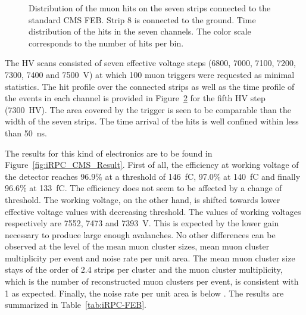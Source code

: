 \begin{figure}[H]
\begin{subfigure}{0.45\linewidth}
			\caption{\label{fig:iRPC_CMS_Profiles:B}}
		\end{subfigure}
		\caption{\label{fig:iRPC_CMS_Profiles}  Distribution of the muon hits on the seven strips connected to the standard CMS FEB. Strip 8 is connected to the ground.  Time distribution of the hits in the seven channels. The color scale corresponds to the number of hits per bin.}
    \end{figure}
    
    The HV scans consisted of seven effective voltage steps (6800, 7000, 7100, 7200, 7300, 7400 and \SI{7500}{V}) at which 100 muon triggers were requested as minimal statistics. The hit profile over the connected strips as well as the time profile of the events in each channel is provided in Figure~\ref{fig:iRPC_CMS_Profiles} for the fifth HV step (\SI{7300}{HV}). The area covered by the trigger is seen to be comparable than the width of the seven strips. The time arrival of the hits is well confined within less than \SI{50}{ns}.
    
    The results for this kind of electronics are to be found in Figure~\ref{fig:iRPC_CMS_Result}. First of all, the efficiency at working voltage of the detector reaches 96.9\% at a threshold of \SI{146}{fC}, 97.0\% at \SI{140}{fC} and finally 96.6\% at \SI{133}{fC}. The efficiency does not seem to be affected by a change of threshold. The working voltage, on the other hand, is shifted towards lower effective voltage values with decreasing threshold. The values of working voltages respectively are 7552, 7473 and \SI{7393}{V}. This is expected by the lower gain necessary to produce large enough avalanches. No other differences can be observed at the level of the mean muon cluster sizes, mean muon cluster multiplicity per event and noise rate per unit area. The mean muon cluster size stays of the order of 2.4 strips per cluster and the muon cluster multiplicity, which is the number of reconstructed muon clusters per event, is consistent with 1 as expected. Finally, the noise rate per unit area is below . The results are summarized in Table~\ref{tab:iRPC-FEB}.
	 
